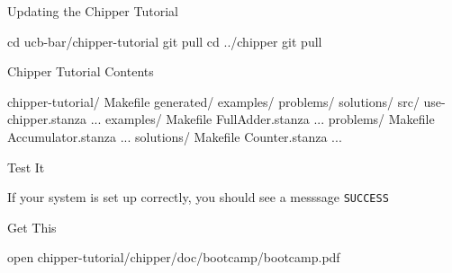 \documentclass[xcolor=pdflatex,dvipsnames,table]{beamer}
\begin{document}
\begin{frame}[fragile]{Updating the Chipper Tutorial}

\begin{stanza}
cd ucb-bar/chipper-tutorial
git pull
cd ../chipper
git pull
\end{stanza}
\end{frame}

\begin{frame}[fragile]{Chipper Tutorial Contents}
{
\begin{FramedSemiVerb}
chipper-tutorial/  
  Makefile
  generated/
    examples/
    problems/
    solutions/
  src/        
    use-chipper.stanza ...
  examples/   
    Makefile  
    FullAdder.stanza ...
  problems/   
    Makefile
    Accumulator.stanza ...
  solutions/  
    Makefile
    Counter.stanza ...
\end{FramedSemiVerb}
}
\end{frame}

\begin{frame}[fragile]{Test It}



\vspace{1cm}
\noindent
If your system is set up correctly, you should see a messsage \verb+SUCCESS+

\end{frame}


\begin{frame}[fragile]{Get This}

\begin{bash}
open chipper-tutorial/chipper/doc/bootcamp/bootcamp.pdf
\end{bash}

\end{frame}
\end{document}
